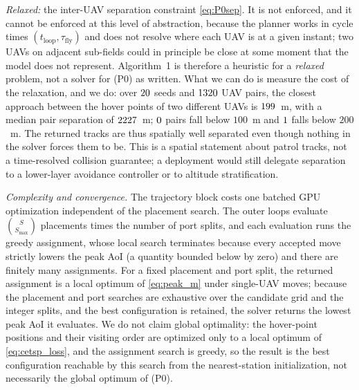\emph{Relaxed:} the inter-UAV separation constraint \eqref{eq:P0sep}. It is not
enforced, and it cannot be enforced at this level of abstraction, because the planner
works in cycle times $(t_{\mathrm{loop}},\tau_{\mathrm{fly}})$ and does not resolve
where each UAV is at a given instant; two UAVs on adjacent sub-fields could in
principle be close at some moment that the model does not represent. Algorithm~1 is
therefore a heuristic for a \emph{relaxed} problem, not a solver for (P0) as written.
What we can do is measure the cost of the relaxation, and we do: over
$20$ seeds and $1320$ UAV pairs, the closest approach between the hover
points of two different UAVs is $199$~m, with a median pair separation of
$2227$~m; $0$ pairs fall below $100$~m and
$1$ falls below $200$~m. The returned tracks are thus spatially
well separated even though nothing in the solver forces them to be. This is a spatial
statement about patrol tracks, not a time-resolved collision guarantee; a deployment
would still delegate separation to a lower-layer avoidance controller or to altitude
stratification.

\emph{Complexity and convergence.} The trajectory block costs one batched
GPU optimization independent of the placement search. The outer loops evaluate
$\binom{S}{S_{\max}}$ placements times the number of port splits, and each
evaluation runs the greedy assignment, whose local search terminates because
every accepted move strictly lowers the peak AoI (a quantity bounded below by
zero) and there are finitely many assignments. For a fixed placement and port
split, the returned assignment is a local optimum of \eqref{eq:peak_m} under
single-UAV moves; because the placement and port searches are exhaustive over the
candidate grid and the integer splits, and the best configuration is retained,
the solver returns the lowest peak AoI it evaluates. We do not claim global optimality: the hover-point positions and their visiting order
are optimized only to a local optimum of \eqref{eq:cetsp_loss}, and the assignment search
is greedy, so the result is the best configuration reachable by this search from the
nearest-station initialization, not necessarily the global optimum of (P0).
